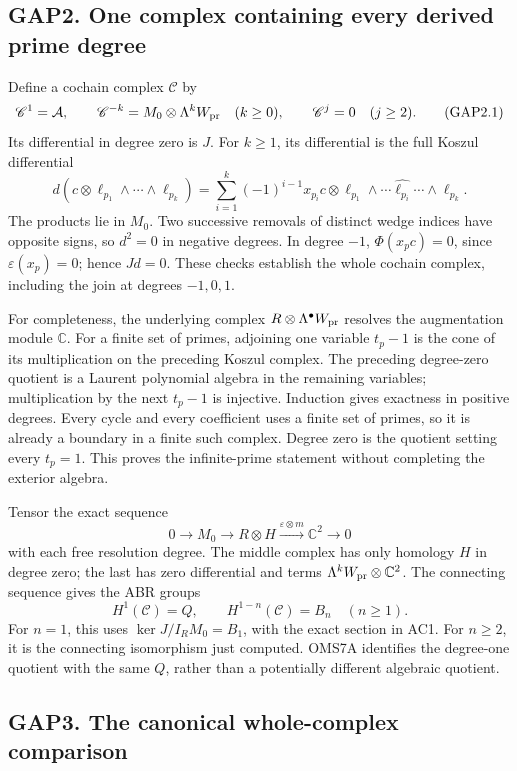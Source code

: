 \subsection{GAP2. One complex containing every derived prime
degree}\label{gap2.-one-complex-containing-every-derived-prime-degree}

Define a cochain complex \(\mathscr C\) by \[
\mathscr C^1=\mathcal A,\qquad
\mathscr C^{-k}=M_0\otimes\Lambda^kW_{\rm pr}\quad(k\ge0),
\qquad \mathscr C^j=0\quad(j\ge2).
\tag{GAP2.1}
\] Its differential in degree zero is \(J\). For \(k\ge1\), its
differential is the full Koszul differential \[
d(c\otimes\ell_{p_1}\wedge\cdots\wedge\ell_{p_k})
=\sum_{i=1}^k(-1)^{i-1}x_{p_i}c\otimes
\ell_{p_1}\wedge\cdots\widehat{\ell_{p_i}}\cdots\wedge\ell_{p_k}.
\tag{GAP2.2}
\] The products lie in \(M_0\). Two successive removals of distinct
wedge indices have opposite signs, so \(d^2=0\) in negative degrees. In
degree \(-1\), \(\Phi(x_pc)=0\), since \(\varepsilon(x_p)=0\); hence
\(Jd=0\). These checks establish the whole cochain complex, including
the join at degrees \(-1,0,1\).

For completeness, the underlying complex
\(R\otimes\Lambda^\bullet W_{\rm pr}\) resolves the augmentation module
\(\mathbb C\). For a finite set of primes, adjoining one variable
\(t_p-1\) is the cone of its multiplication on the preceding Koszul
complex. The preceding degree-zero quotient is a Laurent polynomial
algebra in the remaining variables; multiplication by the next \(t_p-1\)
is injective. Induction gives exactness in positive degrees. Every cycle
and every coefficient uses a finite set of primes, so it is already a
boundary in a finite such complex. Degree zero is the quotient setting
every \(t_p=1\). This proves the infinite-prime statement without
completing the exterior algebra.

Tensor the exact sequence \[
0\to M_0\to R\otimes H\xrightarrow{\varepsilon\otimes m}\mathbb C^2\to0
\] with each free resolution degree. The middle complex has only
homology \(H\) in degree zero; the last has zero differential and terms
\(\Lambda^kW_{\rm pr}\otimes\mathbb C^2\). The connecting sequence gives
the ABR groups \[
H^1(\mathscr C)=Q,\qquad H^{1-n}(\mathscr C)=B_n\quad(n\ge1).
\tag{GAP2.3}
\] For \(n=1\), this uses \(\ker J/I_RM_0=B_1\), with the exact section
in AC1. For \(n\ge2\), it is the connecting isomorphism just computed.
OMS7A identifies the degree-one quotient with the same \(Q\), rather
than a potentially different algebraic quotient.

\subsection{GAP3. The canonical whole-complex
comparison}\label{gap3.-the-canonical-whole-complex-comparison}

